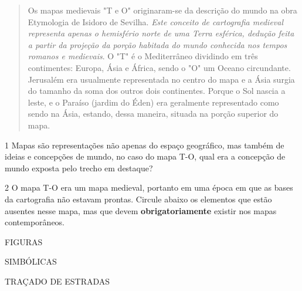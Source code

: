 \begin{quote}
Os mapas medievais "T e O" originaram-se da descrição do mundo na
obra Etymologia de Isidoro de Sevilha. \emph{Este conceito de
cartografia medieval representa apenas o hemisfério norte de uma Terra
esférica, dedução feita a partir da projeção da porção habitada do mundo
conhecida nos tempos romanos e medievais}. O "T" é o Mediterrâneo
dividindo em três contimentes: Europa, Ásia e África, sendo o "O" um
Oceano circundante. Jerusalém era usualmente representada no centro do
mapa e a Ásia surgia do tamanho da soma dos outros dois continentes.
Porque o Sol nascia a leste, e o Paraíso (jardim do Éden) era geralmente
representado como sendo na Ásia, estando, dessa maneira, situada na
porção superior do mapa.

\end{quote}

\num{1} Mapas são representações não apenas do espaço geográfico, mas também
de ideias e concepções de mundo, no caso do mapa T-O, qual era a
concepção de mundo exposta pelo trecho em destaque?



\num{2} O mapa T-O era um mapa medieval, portanto em uma época em que as
bases da cartografia não estavam prontas.
Circule abaixo os elementos que estão ausentes nesse mapa, mas que devem
\textbf{obrigatoriamente} existir nos mapas contemporâneos.

\begin{multicols}{2}

FIGURAS


SIMBÓLICAS

TRAÇADO DE ESTRADAS
\end{multicols}


